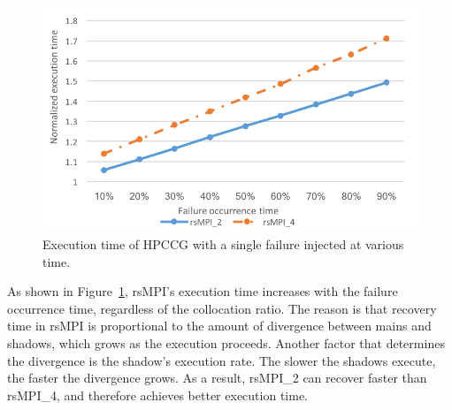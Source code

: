 \begin{figure}[!t]
  \begin{center}
      \includegraphics[width=0.9\columnwidth]{figures/single_failure_2}
  \end{center}
  \vskip -0.25in
  \caption{Execution time of HPCCG with a single failure injected at various time.}
  \label{fig:single_failure}
\vspace{-0.25in}
\end{figure}

As shown in Figure~\ref{fig:single_failure}, rsMPI's execution time increases with the failure occurrence time, regardless of the collocation ratio. The reason is that recovery time in rsMPI is proportional to the amount of divergence between mains and shadows, which grows as the execution proceeds. 
Another factor that determines the divergence is the shadow's execution rate. The slower the shadows execute, the faster the divergence grows. As a result, rsMPI\_2 can recover faster than rsMPI\_4, and therefore achieves better execution time.



